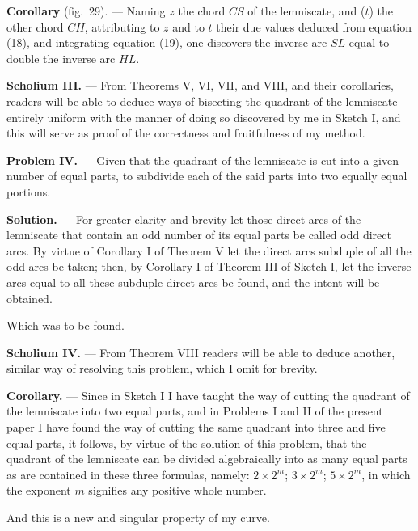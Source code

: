 \documentclass{article}
\begin{document}
\textbf{Corollary} (fig.~29). --- Naming $z$ the chord $CS$ of the lemniscate, and ($t$) the
other chord $CH$, attributing to $z$ and to $t$ their due values deduced from equation (18), and
integrating equation (19), one discovers the inverse arc $SL$ equal to double the inverse arc
$HL$.

\textbf{Scholium III.} --- From Theorems V, VI, VII, and VIII, and their corollaries, readers
will be able to deduce ways of bisecting the quadrant of the lemniscate entirely uniform with
the manner of doing so discovered by me
in Sketch I, and this will serve as proof of the correctness and fruitfulness of my method.

\textbf{Problem IV.} --- Given that the quadrant of the lemniscate is cut into a given number of
equal parts, to subdivide each of the said parts into two equally equal portions.

\textbf{Solution.} --- For greater clarity and brevity let those direct arcs of the lemniscate
that contain an odd number of its equal parts be called odd direct arcs. By virtue of Corollary I
of Theorem V let the direct arcs subduple of all the odd arcs be taken; then, by Corollary I of
Theorem III of Sketch I, let the inverse arcs equal to all these subduple direct arcs be found,
and the intent will be obtained.

Which was to be found.

\textbf{Scholium IV.} --- From Theorem VIII readers will be able to deduce another, similar way
of resolving this problem, which I omit for brevity.

\textbf{Corollary.} --- Since in Sketch I I have taught the way of cutting the quadrant of the
lemniscate into two equal parts, and in Problems I and II of the present paper I have found the
way of cutting the same quadrant into three and five equal parts, it follows, by virtue of the
solution of this problem, that the quadrant of the lemniscate can be divided algebraically into
as many equal parts as are contained in these three formulas, namely: $2 \times 2^{m}$;
$3 \times 2^{m}$; $5 \times 2^{m}$, in which the exponent $m$ signifies any positive whole number.

And this is a new and singular property of my curve.
\end{document}
